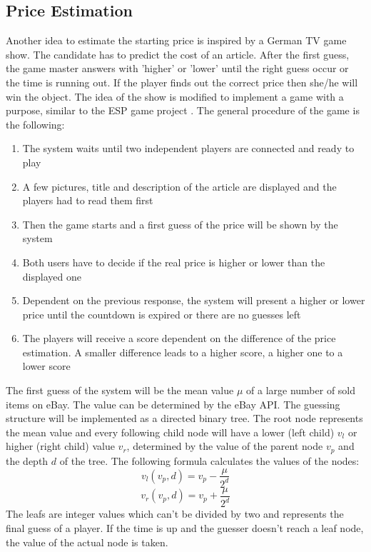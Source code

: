 \subsection{Price Estimation}
Another idea to estimate the starting price is inspired by a German TV game show. The candidate has to predict the cost of an article. After the first guess, the game master answers with 'higher' or 'lower' until the right guess occur or the time is running out. If the player finds out the correct price then she/he will win the object.  
The idea of the show is modified to implement a game with a purpose, similar to the ESP game project \cite{esp}. The general procedure of the game is the following: 
\begin{enumerate}
	\item The system waits until two independent players are connected and ready to play 
	\item A few pictures, title and description of the article are displayed and the players had to read them first 
	\item Then the game starts and a first guess of the price will be shown by the system 
	\item Both users have to decide if the real price is higher or lower than the displayed one 
	\item Dependent on the previous response, the system will present a higher or lower price until the countdown is expired or there are no guesses left 
	\item The players will receive a score dependent on the difference of the price estimation. A smaller difference leads to a higher score, a higher one to a lower score 
\end{enumerate}
The first guess of the system will be the mean value \( \mu \) of a large number of sold items on eBay. The value can be determined by the eBay API. The guessing structure will be implemented as a directed binary tree. The root node represents the mean value and every following child node will have a lower (left child) \( v_l \) or higher (right child) value  \( v_r \), determined by the value of the parent node  \( v_p \) and the depth  \( d \) of the tree. The following formula calculates the values  of the nodes: 
\begin{equation}
v_l(v_p,d) = v_p - \frac{\mu}{2^d}
\end{equation}
\begin{equation}
v_r(v_p,d) = v_p + \frac{\mu}{2^d}
\end{equation}
The leafs are integer values which can't be divided by two and represents the final guess of a player. If the time is up and the guesser doesn't reach a leaf node, the value of the actual node is taken. 
